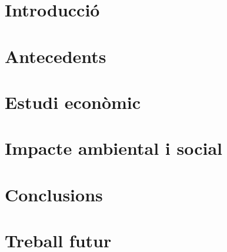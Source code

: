 \documentclass{tfgitic}
\title{}
\author{}
\begin{document}

\chapter{Introducció}
\chapter{Antecedents}


\chapter{Estudi econòmic}
\chapter{Impacte ambiental i social}
\chapter{Conclusions}
\chapter{Treball futur}


\printbibliography

\end{document}

